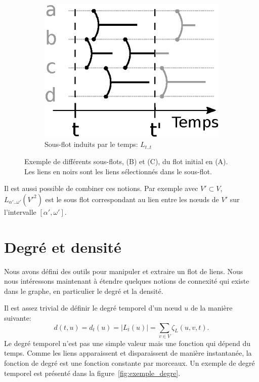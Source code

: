 \begin{figure}[]
	\begin{subfigure}{0.2\linewidth}
		\includegraphics[width=\linewidth]{img/Intro/sous_flots2.eps}\hfill
		\caption{Sous-flot induits par le temps:  $L_{t..t}$}
		\label{fig:exemple_sous_flot2}	
	\end{subfigure}
	\caption{Exemple de différents sous-flots, (B) et (C), du flot initial en (A). Les liens en noirs sont les liens sélectionnés dans le sous-flot. }
\label{fig:exemple_sous_flot}
\end{figure}

Il est aussi possible de combiner ces notions.
Par exemple avec $V' \subset V$, $L_{\alpha'..\omega'}(V'^2)$ est le sous flot correspondant au lien entre les n\oe uds de $V'$ sur l'intervalle $[\alpha', \omega']$.


\section{Degré et densité}
\label{sec:def_densite}
Nous avons défini des outils pour manipuler et extraire un flot de liens.
Nous nous intéressons maintenant à étendre quelques notions de connexité qui existe dans le graphe, en particulier le degré et la densité.

Il est assez trivial de définir le degré temporel d'un n\oe ud $u$ de la manière suivante:
\begin{equation}
d(t,u)=d_t(u)= |L_t(u)|= \sum_{v \in V} \zeta_{L}(u,v,t).
\end{equation}
Le degré temporel n'est pas une simple valeur mais une fonction qui dépend du temps.
Comme les liens apparaissent et disparaissent de manière instantanée, la fonction de degré est une fonction constante par morceaux.
Un exemple de degré temporel est présenté dans la figure~\ref{fig:exemple_degre}.

